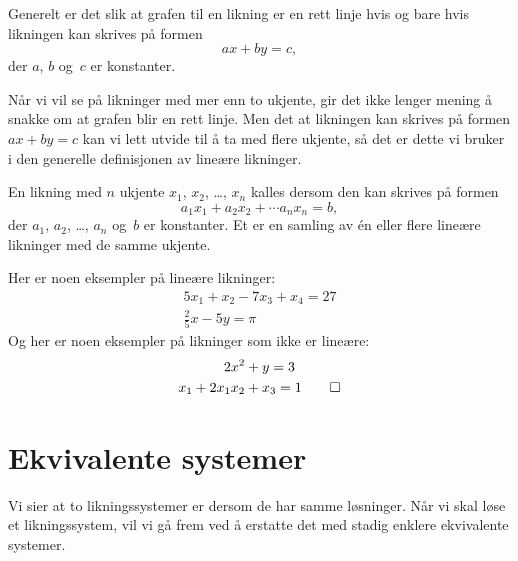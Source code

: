 Generelt er det slik at grafen til en likning er en rett linje hvis og
bare hvis likningen kan skrives på formen
\[
ax + by = c,
\]
der $a$, $b$ og~$c$ er konstanter.

Når vi vil se på likninger med mer enn to ukjente, gir det ikke lenger
mening å snakke om at grafen blir en rett linje.  Men det at likningen
kan skrives på formen $ax + by = c$ kan vi lett utvide til å ta med
flere ukjente, så det er dette vi bruker i den generelle definisjonen
av lineære likninger.

\begin{defn}
En likning med $n$ ukjente $x_1$, $x_2$, \ldots, $x_n$ kalles
 dersom den kan skrives på formen
\[
a_1 x_1 + a_2 x_2 + \cdots a_n x_n = b,
\]
der $a_1$, $a_2$, \ldots, $a_n$ og~$b$ er konstanter.  Et
 er en samling av én eller flere
lineære likninger med de samme ukjente.
\end{defn}


\begin{ex}
Her er noen eksempler på lineære likninger:
\begin{gather*}
5 x_1 + x_2 - 7 x_3 + x_4 = 27 \\
\frac{2}{5} x - 5y = \pi
\end{gather*}
Og her er noen eksempler på likninger som ikke er lineære:
\begin{gather*}
2 x^2 + y = 3 \\
x_1 + 2 x_1 x_2 + x_3 = 1
\qedhere
\end{gather*}
\end{ex}


\section*{Ekvivalente systemer}

Vi sier at to likningssystemer er  dersom de har
samme løsninger.  Når vi skal løse et likningssystem, vil vi gå frem
ved å erstatte det med stadig enklere ekvivalente systemer.

